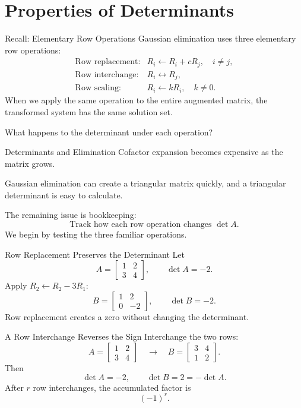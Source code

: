 \section[Properties]{Properties of Determinants}

\begin{frame}{Recall: Elementary Row Operations}
Gaussian elimination uses three elementary row operations:
\[
\begin{array}{ll}
\text{Row replacement:} & R_i\leftarrow R_i+cR_j,\quad i\ne j,\\[0.5ex]
\text{Row interchange:} & R_i\leftrightarrow R_j,\\[0.5ex]
\text{Row scaling:} & R_i\leftarrow kR_i,\quad k\ne0.
\end{array}
\]
\pause
When we apply the same operation to the entire augmented matrix, the transformed system has the same solution set.
\medskip

What happens to the determinant under each operation?
\end{frame}

\begin{frame}{Determinants and Elimination}
Cofactor expansion becomes expensive as the matrix grows.
\pause

Gaussian elimination can create a triangular matrix quickly, and a triangular determinant is easy to calculate.
\medskip

The remaining issue is bookkeeping:
\[
\boxed{\text{Track how each row operation changes }\det A.}
\]
We begin by testing the three familiar operations.
\end{frame}

\begin{frame}{Row Replacement Preserves the Determinant}
Let
\[
A=\begin{bmatrix}1&2\\3&4\end{bmatrix},
\qquad \det A=-2.
\]
Apply $R_2\leftarrow R_2-3R_1$:
\[
B=\begin{bmatrix}1&2\\0&-2\end{bmatrix},
\qquad \det B=-2.
\]
\pause
Row replacement creates a zero without changing the determinant.
\end{frame}

\begin{frame}{A Row Interchange Reverses the Sign}
Interchange the two rows:
\[
A=\begin{bmatrix}1&2\\3&4\end{bmatrix}
\quad\longrightarrow\quad
B=\begin{bmatrix}3&4\\1&2\end{bmatrix}.
\]
Then
\[
\det A=-2,
\qquad
\det B=2=-\det A.
\]
\pause
After $r$ row interchanges, the accumulated factor is
\[
(-1)^r.
\]
\end{frame}

